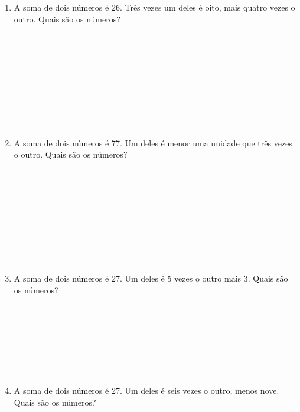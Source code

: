 \documentclass[a4paper,14pt]{article}
\begin{document}
\begin{multicols}{2}
\begin{enumerate}
			\item A soma de dois números é 26. Três vezes um deles é oito, mais quatro vezes o outro. Quais são os números? \\\\\\\\\\\\\\\\\\\\
			\item A soma de dois números é 77. Um deles é menor uma unidade que três vezes o outro. Quais são os números? \\\\\\\\\\\\\\\\\\\\
			\item A soma de dois números é 27. Um deles é 5 vezes o outro mais 3. Quais são os números? \\\\\\\\\\\\\\\\
			\item A soma de dois números é 27. Um deles é seis vezes o outro, menos nove. Quais são os números? \\\\\\\\\\\\\\\\\\\\
		\end{enumerate}

\end{multicols}
\end{document}
